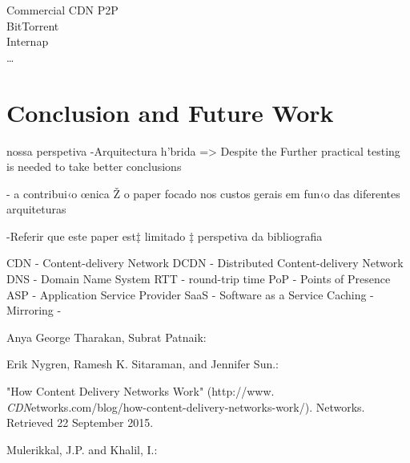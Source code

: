 \documentclass{llncs}
\begin{document}
		Commercial CDN P2P\\
			BitTorrent\\
			Internap\\
			\dots\\
\fi




\section{Conclusion and Future Work}						%





nossa perspetiva
-Arquitectura h’brida => Despite the  Further practical testing is needed to take better conclusions

- a contribui‹o œnica Ž o paper focado nos custos gerais em fun‹o das diferentes arquiteturas

-Referir que este paper est‡ limitado ‡ perspetiva da bibliografia


\if
	CDN - Content-delivery Network
	DCDN - Distributed Content-delivery Network
	DNS - Domain Name System
	RTT - round-trip time
	PoP - Points of Presence
	ASP - Application Service Provider
	SaaS - Software as a Service
	Caching -
	Mirroring -
\fi	

\begin{thebibliography}{1}
	Anya George Tharakan, Subrat Patnaik: 

	Erik Nygren, Ramesh K. Sitaraman, and Jennifer Sun.:

	"How Content Delivery Networks Work" (http://www. \textit{CDN}etworks.com/blog/how-content-delivery-networks-work/).
	Networks. Retrieved 22 September 2015.

	Mulerikkal, J.P. and Khalil, I.:


\end{thebibliography}
\end{document}
